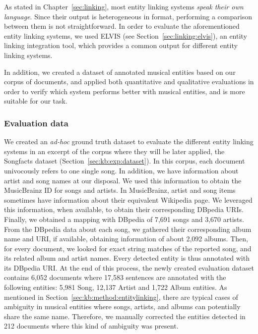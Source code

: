 As stated in Chapter~\ref{sec:linking}, most entity linking systems \textit{speak their own language}. Since their output is heterogeneous in format, performing a comparison between them is not straightforward. In order to evaluate the aforementioned entity linking systems, we used \textsc{ELVIS} (see Section~\ref{sec:linking:elvis}), an entity linking integration tool, which provides a common output for different entity linking systems.

In addition, we created a dataset of annotated musical entities based on our corpus of documents, and applied both quantitative and qualitative evaluations in order to verify which system performs better with musical entities, and is more suitable for our task.



\subsubsection{Evaluation data}

We created an \textit{ad-hoc} ground truth dataset to evaluate the different entity linking systems in an excerpt of the corpus where they will be later applied, the Songfacts dataset (Section~\ref{sec:kb:exp:dataset}). In this corpus, each document univocously refers to one single song. In addition, we have information about artist and song names at our disposal. We used this information to obtain the MusicBrainz ID for songs and artists. In MusicBrainz, artist and song items sometimes have information about their equivalent Wikipedia page. We leveraged this information, when available, to obtain their corresponding DBpedia URIs. Finally, we obtained a mapping with DBpedia of 7,691 songs and 3,670 artists. From the DBpedia data about each song, we gathered their corresponding album name and URI, if available, obtaining information of about 2,092 albums. Then, for every document, we looked for exact string matches of the reported song, and its related album and artist names. Every detected entity is thus annotated with its DBpedia URI. At the end of this process, the newly created evaluation dataset contains 6,052 documents where 17,583 sentences are annotated with the following entities: 5,981 Song, 12,137 Artist and 1,722 Album entities. As mentioned in Section~\ref{sec:kb:method:entitylinking}, there are typical cases of ambiguity in musical entities where songs, artists, and albums can potentially share the same name. Therefore, we manually corrected the entities detected in 212 documents where this kind of ambiguity was present.


